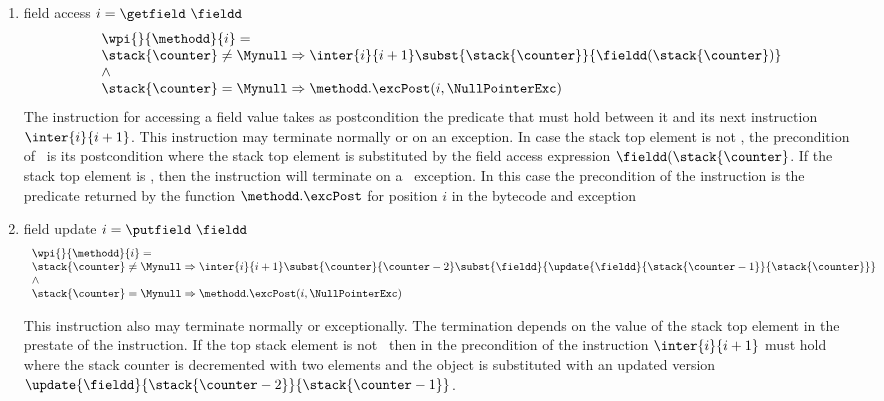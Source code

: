 \begin{itemize}
\begin{enumerate}
			\item field access  $ i = \getfield  \ \fieldd  $\\
				 $$ 	\begin{array}{l} \wpi{} {\methodd}{i}  =  \\
				 		\stack{\counter } \ne \Mynull \Rightarrow 
						      \inter{i}{i+1}\subst{\stack{\counter }}{\fieldd ( \stack{\counter } ) } \\
									 \wedge \\
						\stack{\counter } = \Mynull \Rightarrow \methodd.\excPost( i, \NullPointerExc) 
					\end{array} 
					$$
			  The instruction for accessing a field value takes as postcondition the predicate that must hold between it and its next instruction
			  $\inter{i}{i+1}$.  This instruction may terminate normally or on an exception.
			  In case the stack top element is not \Mynull, the precondition of \getfield \ is its postcondition where the stack 
			  top element is substituted by the field access expression $\fieldd ( \stack{\counter }$.
			  If the stack top element is \Mynull, then the instruction will terminate on  a \NullPointerExc \ exception. In this case the precondition
			  of the instruction is the predicate returned by the function $\methodd.\excPost$ for position $i$ in the bytecode and exception \NullPointerExc
			  
			\item  field update $ i = \putfield  \ \fieldd$\\
			$$\begin{array}{l}
                                  \wpi{  } {\methodd}{i}  =  \\
				 		\stack{\counter } \ne \Mynull \Rightarrow 
						 \inter{i}{i+1}
                                                     
                                                              \subst{ \counter }{  \counter -2 }
							     \subst{  \fieldd}{ \update{\fieldd}{ \stack{\counter - 1}}{  \stack{\counter} } }
						       
						        \\
							\wedge \\
							\stack{\counter } = \Mynull \Rightarrow   \methodd.\excPost( i, \NullPointerExc ) \\
					  \end{array} 
					$$
			                
			                This instruction  also may terminate normally or exceptionally. The termination depends on the value of the stack 
					top element in the prestate of the instruction. If the top stack element is not \Mynull \ then in the precondition
					of the instruction $\inter{i}{i+1}$ must hold where the stack counter is decremented with two elements and
					the \fieldd object is substituted with an updated version $\update{\fieldd}{ \stack{\counter - 2}}{  \stack{\counter  -1} } $.
				

\end{enumerate}
\end{itemize}
